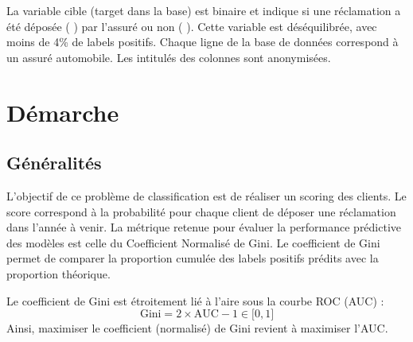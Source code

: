 \documentclass[french]{article}
\begin{document}
\begin{multicols}{2}
La variable cible (\og target \fg{} dans la base) est binaire et indique si une réclamation a été déposée ( \fg{}) par l'assuré ou non ( \fg{}). Cette variable est déséquilibrée, avec moins de 4\% de labels positifs. Chaque ligne de la base de données correspond à un assuré automobile. Les intitulés des colonnes sont anonymisées.



\section{Démarche} 

\subsection{Généralités}

L'objectif de ce problème de classification est de réaliser un scoring des clients. Le score correspond à la probabilité pour chaque client de déposer une réclamation dans l'année à venir. La métrique retenue pour évaluer la performance prédictive des modèles est celle du Coefficient Normalisé de Gini. Le coefficient de Gini permet de comparer la proportion cumulée des labels positifs prédits avec la proportion théorique. 

Le coefficient de Gini est étroitement lié à l'aire sous la courbe ROC (AUC) :
\[ \text{Gini} = 2 \times \text{AUC} - 1  \in \lbrack 0 , 1 \rbrack \]
Ainsi, maximiser le coefficient (normalisé) de Gini revient à maximiser l'AUC.







\end{multicols}
\end{document}
